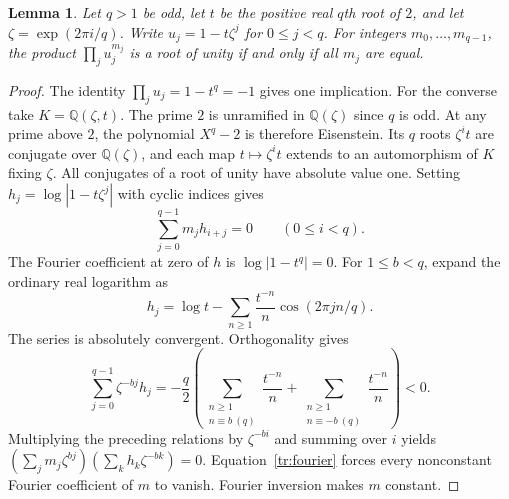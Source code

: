 \documentclass[11pt]{article}
\newtheorem{lemma}[theorem]{Lemma}
\begin{document}
\begin{lemma}\label{tr:units}
Let $q>1$ be odd, let $t$ be the positive real $q$th root of $2$,
and let $\zeta=\exp(2\pi i/q)$. Write $u_j=1-t\zeta^j$ for
$0\le j<q$. For integers $m_0,\ldots,m_{q-1}$, the product
$\prod_j u_j^{m_j}$ is a root of unity if and only if all $m_j$
are equal.
\end{lemma}
\begin{proof}
The identity $\prod_j u_j=1-t^q=-1$ gives one implication.
For the converse take $K=\mathbb Q(\zeta,t)$. The prime $2$ is
unramified in $\mathbb Q(\zeta)$ since $q$ is odd. At any prime
above $2$, the polynomial $X^q-2$ is therefore Eisenstein. Its $q$
roots $\zeta^it$ are conjugate over $\mathbb Q(\zeta)$, and each map
$t\mapsto\zeta^it$ extends to an automorphism of $K$ fixing
$\zeta$. All conjugates of a root of unity have absolute value one.
Setting $h_j=\log|1-t\zeta^j|$ with cyclic indices gives
\[
                \sum_{j=0}^{q-1}m_jh_{i+j}=0
                 \qquad(0\le i<q).
\]
The Fourier coefficient at zero of $h$ is $\log|1-t^q|=0$.
For $1\le b<q$, expand the ordinary real logarithm as
\[
 h_j=\log t-\sum_{n\ge1}\frac{t^{-n}}{n}
                  \cos(2\pi jn/q).
\]
The series is absolutely convergent. Orthogonality gives
\begin{equation}\label{tr:fourier}
 \sum_{j=0}^{q-1}\zeta^{-bj}h_j
 =-\frac q2\left(
 \sum_{\substack{n\ge1\\n\equiv b\ (q)}}\frac{t^{-n}}{n}
 +
 \sum_{\substack{n\ge1\\n\equiv -b\ (q)}}\frac{t^{-n}}{n}
 \right)<0 .
\end{equation}
Multiplying the preceding relations by $\zeta^{-bi}$ and summing
over $i$ yields
$(\sum_j m_j\zeta^{bj})(\sum_k h_k\zeta^{-bk})=0$.
Equation~\eqref{tr:fourier} forces every nonconstant Fourier
coefficient of $m$ to vanish. Fourier inversion makes $m$ constant.
\end{proof}
\end{document}
